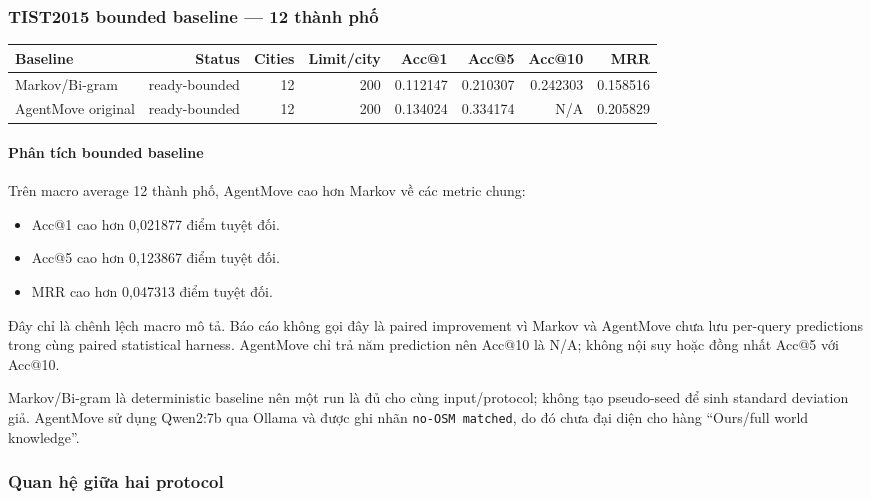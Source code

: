 \subsubsection*{TIST2015 bounded baseline --- 12 thành phố}

\begin{table}[!htbp]
\centering
\scriptsize
\setlength{\tabcolsep}{2.5pt}
\begin{adjustbox}{max width=\textwidth}
\begin{tabular}{@{}lrrrrrrr@{}}
\toprule
Baseline & Status & Cities & Limit/city & Acc@1 & Acc@5 & Acc@10 & MRR \\
\midrule
Markov/Bi-gram & ready-bounded & 12 & 200 & 0.112147 & 0.210307 & 0.242303 & 0.158516 \\
AgentMove original & ready-bounded & 12 & 200 & 0.134024 & 0.334174 & N/A & 0.205829 \\
\bottomrule
\end{tabular}
\end{adjustbox}
\end{table}

\paragraph{Phân tích bounded baseline}

Trên macro average 12 thành phố, AgentMove cao hơn Markov về các metric chung:

\begin{itemize}
\item Acc@1 cao hơn 0,021877 điểm tuyệt đối.
\item Acc@5 cao hơn 0,123867 điểm tuyệt đối.
\item MRR cao hơn 0,047313 điểm tuyệt đối.
\end{itemize}

Đây chỉ là chênh lệch macro mô tả. Báo cáo không gọi đây là paired improvement vì Markov và AgentMove chưa lưu per-query predictions trong cùng paired statistical harness. AgentMove chỉ trả năm prediction nên Acc@10 là N/A; không nội suy hoặc đồng nhất Acc@5 với Acc@10.

Markov/Bi-gram là deterministic baseline nên một run là đủ cho cùng input/protocol; không tạo pseudo-seed để sinh standard deviation giả. AgentMove sử dụng Qwen2:7b qua Ollama và được ghi nhãn \texttt{no-OSM matched}, do đó chưa đại diện cho hàng “Ours/full world knowledge”.

\subsubsection*{Quan hệ giữa hai protocol}

